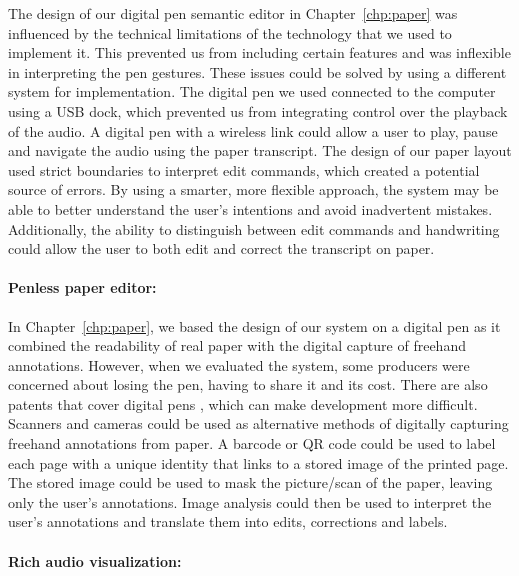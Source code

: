 The design of our digital pen semantic editor in Chapter~\ref{chp:paper} was influenced by the technical limitations of
the technology that we used to implement it.  This prevented us from including certain features and was inflexible in
interpreting the pen gestures.  These issues could be solved by using a different system for implementation.  The
digital pen we used connected to the computer using a USB dock, which prevented us from integrating control over the
playback of the audio. A digital pen with a wireless link could allow a user to play, pause and navigate the audio
using the paper transcript.  The design of our paper layout used strict boundaries to interpret edit commands, which
created a potential source of errors. By using a smarter, more flexible approach, the system may be able to better
understand the user's intentions and avoid inadvertent mistakes. Additionally, the ability to distinguish between
edit commands and handwriting could allow the user to both edit and correct the transcript on paper.

\paragraph{Penless paper editor:}

In Chapter~\ref{chp:paper}, we based the design of our system on a digital pen as it combined the readability of real
paper with the digital capture of freehand annotations. However, when we evaluated the system, some producers were
concerned about losing the pen, having to share it and its cost. There are also patents that cover digital pens
\citep{Fahraeus2003}, which can make development more difficult.  Scanners and cameras could be used as alternative
methods of digitally capturing freehand annotations from paper. A barcode or QR code could be used to label each page
with a unique identity that links to a stored image of the printed page. The stored image could be used to mask the
picture/scan of the paper, leaving only the user's annotations. Image analysis could then be used to interpret the
user's annotations and translate them into edits, corrections and labels.

\paragraph{Rich audio visualization:}

